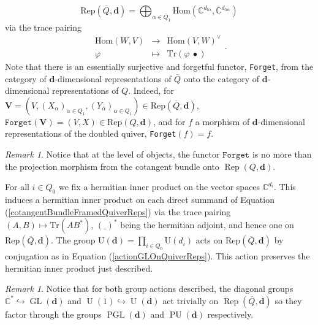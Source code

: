 \documentclass{amsart}
\theoremstyle{plain}
\numberwithin{equation}{section}
\theoremstyle{definition}
\theoremstyle{remark}
\newtheorem{remark}[theorem]{Remark}
\begin{document}
	\begin{equation}\label{cotangentBundleFramedQuiverReps}
		\text{Rep}(\overline{Q},\mathbf{d})=\bigoplus_{\alpha\in\overline{Q} _1}\text{Hom}(\mathbb{C}^{d_{t\alpha}},\mathbb{C}^{d_{h\alpha}})
	\end{equation}
	via the trace pairing 
	\begin{equation}\label{tracePairing}
		\begin{matrix}
			\text{Hom}(W,V)&\longrightarrow&\text{Hom}(V,W)^{\vee}\\ \varphi&\longmapsto &\text{Tr}(\varphi \ \bullet)
		\end{matrix}.
	\end{equation}
	Note that there is an essentially surjective and forgetful functor, \texttt{Forget}, from the category of $\mathbf{d}$-dimensional representations of $\overline{Q}$ onto the category of $\mathbf{d}$-dimensional representations of $Q$. Indeed, for $\mathbf{V}=(V,(X_\alpha)_{\alpha\in Q_1},(Y_{\overline{\alpha}})_{\alpha\in Q_1})\in \text{Rep}(\overline{Q},\mathbf{d})$, $\texttt{Forget}(\mathbf{V})=(V,X)\in \text{Rep}(Q,\textbf{d})$, and for $f$ a morphism of $\mathbf{d}$-dimensional representations of the doubled quiver, \texttt{Forget}$(f)=f$.
	\begin{remark}
	Notice that at the level of objects, the functor $\texttt{Forget}$ is no more than the projection morphism from the cotangent bundle onto $\operatorname{Rep}(Q,\mathbf{d})$. 
	\end{remark}
	For all $i\in Q_0$ we fix a hermitian inner product on the vector spaces $\mathbb{C}^{d_i}$. This induces a hermitian inner product on each direct summand of Equation (\ref{cotangentBundleFramedQuiverReps}) via the trace pairing $(A,B)\mapsto\text{Tr}(AB^*)$, $(\_)^*$ being the hermitian adjoint, and hence one on $\text{Rep}(\overline{Q},\mathbf{d})$. The group $\text{U}(\mathbf{d})=\prod_{i\in Q_0}\text{U}(d_i)$ acts on $\text{Rep}(\overline{Q},\mathbf{d})$ by conjugation as in Equation (\ref{actionGLOnQuiverReps}). This action preserves the hermitian inner product just described.
	\begin{remark}\label{diagonalSubgroupsActingTrivially}
	Notice that for both group actions described, the diagonal groups $\mathbb{C}^*\hookrightarrow\operatorname{GL}(\mathbf{d})$ and $\operatorname{U}(1)\hookrightarrow\operatorname{U}(\mathbf{d})$ act trivially on $\operatorname{Rep}(\overline{Q},\mathbf{d})$ so they factor through the groups $\operatorname{PGL}(\mathbf{d})$ and $\operatorname{PU}(\mathbf{d})$ respectively. 
	\end{remark}
\end{document}
